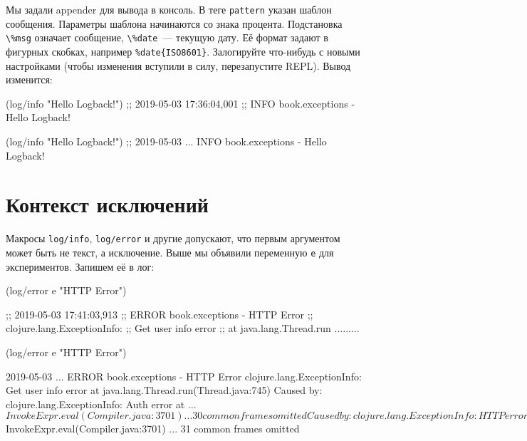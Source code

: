 \fi


Мы задали appender для вывода в консоль. В теге \verb|pattern| указан шаблон
сообщения. Параметры шаблона начинаются со знака процента. Подстановка
\verb|\%msg| означает сообщение, \verb|\%date|~--- текущую дату. Её формат
задают в фигурных скобках, например \verb|%date{ISO8601}|. Залогируйте
что-нибудь с новыми настройками (чтобы изменения вступили в силу, перезапустите
REPL). Вывод изменится:

\ifnarrow

\begin{english}
  \begin{clojure}
(log/info "Hello Logback!")
;; 2019-05-03 17:36:04,001
;; INFO book.exceptions - Hello Logback!
  \end{clojure}
\end{english}

\else

\begin{english}
  \begin{clojure}
(log/info "Hello Logback!")
;; 2019-05-03 ... INFO book.exceptions - Hello Logback!
  \end{clojure}
\end{english}

\fi

\label{log-ex-param}

\section{Контекст исключений}

Макросы \verb|log/info|, \verb|log/error| и другие допускают, что первым
аргументом может быть не текст, а исключение. Выше мы объявили переменную
\verb|e| для экспериментов. Запишем её в лог:

\ifnarrow

\begin{english}
  \begin{clojure}
(log/error e "HTTP Error")

;; 2019-05-03 17:41:03,913
;; ERROR book.exceptions - HTTP Error
;; clojure.lang.ExceptionInfo:
;; Get user info error
;; at java.lang.Thread.run .........
  \end{clojure}
\end{english}

\else

\begin{english}
  \begin{clojure}
(log/error e "HTTP Error")

2019-05-03 ... ERROR book.exceptions - HTTP Error
clojure.lang.ExceptionInfo: Get user info error
    at java.lang.Thread.run(Thread.java:745)
Caused by: clojure.lang.ExceptionInfo: Auth error
    at ...$InvokeExpr.eval(Compiler.java:3701)
    ... 30 common frames omitted
Caused by: clojure.lang.ExceptionInfo: HTTP error
    at ...$InvokeExpr.eval(Compiler.java:3701)
    ... 31 common frames omitted
  \end{clojure}
\end{english}

